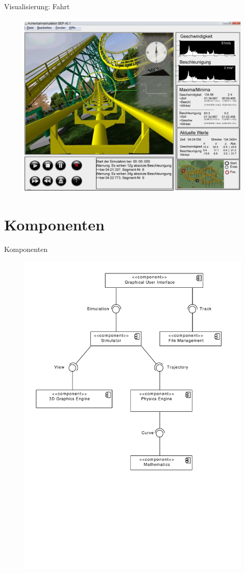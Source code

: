\documentclass[
	ngerman,
	xcolor=dvipsnames,
	11pt
	]{beamer}
\begin{document}
		\begin{frame}{Visualisierung: Fahrt}
		\begin{figure}
			\includegraphics[width=0.78\linewidth]{GUI_v2.jpg}
		\end{figure}
	\end{frame}
	
	\section{Komponenten}
	\begin{frame}{Komponenten}
		\begin{figure}
			\includegraphics[width=0.62\linewidth]{Component_Overview.pdf}
		\end{figure}
	\end{frame}
	
	
\end{document}
